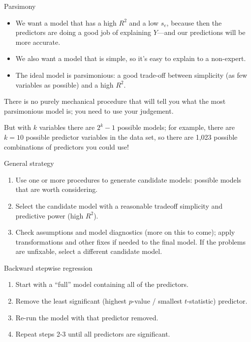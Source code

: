 \documentclass{beamer}\usepackage[]{graphicx}\usepackage[]{color}
\begin{document}
\begin{darkframes}
    \begin{frame}{Parsimony}
      \begin{itemize}[<+->]
        \item We want a model that has a high $R^2$ and a low $s_e$, because then the predictors are doing a good job of explaining $Y$---and our predictions will be more accurate.
        \item We also want a model that is simple, so it's easy to explain to a non-expert.
        \item The ideal model is \alert{parsimonious}: a good trade-off between simplicity (as few variables as possible) and a high $R^2$.
      \end{itemize}
    \end{frame}

    \begin{frame}
      \begin{center}
        There is no purely mechanical procedure that will tell you what the most parsimonious model is; you need to use your judgement.

        \bigskip\pause

        But with $k$ variables there are $2^k-1$ possible models; for example, there are $k=10$ possible predictor variables in the data set, so there are 1,023 possible combinations of predictors you could use!
      \end{center}
    \end{frame}

    \begin{frame}{General strategy}
      \begin{enumerate}[<+->]
        \item Use one or more procedures to generate candidate models: possible models that are worth considering.
        \item Select the candidate model with a reasonable tradeoff simplicity and predictive power (high $R^2$).
        \item Check assumptions and model diagnostics (more on this to come); apply transformations and other fixes if needed to the final model. If the problems are unfixable, select a different candidate model.
      \end{enumerate}
    \end{frame}

    \begin{frame}{Backward stepwise regression}
      \begin{enumerate}
        \item Start with a ``full'' model containing all of the predictors.
        \item Remove the least significant (highest $p$-value / smallest $t$-statistic) predictor.
        \item Re-run the model with that predictor removed.
        \item Repeat steps 2-3 until all predictors are significant.
      \end{enumerate}
    \end{frame}


\end{darkframes}
\end{document}
